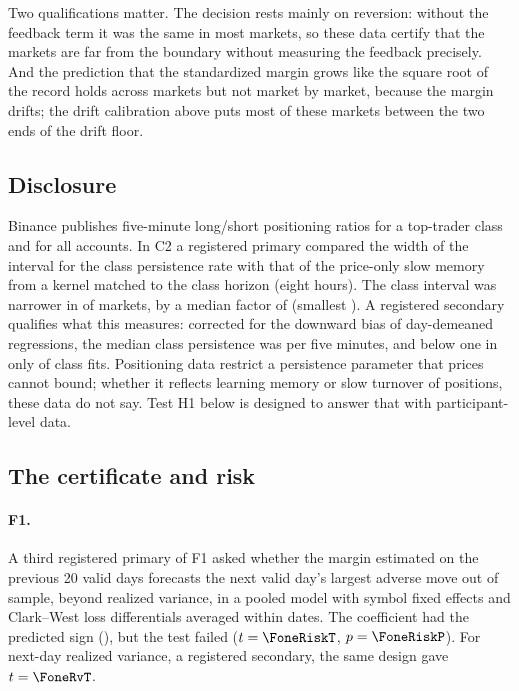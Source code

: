 \documentclass[12pt]{article}
\theoremstyle{definition}
\theoremstyle{remark}
\begin{document}
Two qualifications matter. The decision rests mainly on reversion: without the feedback term it was the same in most markets, so these data certify that the markets are far from the boundary without measuring the feedback precisely. And the prediction that the standardized margin grows like the square root of the record holds across markets but not market by market, because the margin drifts; the drift calibration above puts most of these markets between the two ends of the drift floor.

\subsection{Disclosure}

Binance publishes five-minute long/short positioning ratios for a top-trader class and for all accounts. In C2 a registered primary compared the width of the interval for the class persistence rate with that of the price-only slow memory from a kernel matched to the class horizon (eight hours). The class interval was narrower in \CtwoPthreeTighter{} of \CtwoPthreeSymbols{} markets, by a median factor of \CtwoRatio{} (smallest \CtwoMinRatio{}). A registered secondary qualifies what this measures: corrected for the downward bias of day-demeaned regressions, the median class persistence was \CtwoJackR{} per five minutes, and below one in only \CtwoJackBelow{} of \CtwoClassFits{} class fits. Positioning data restrict a persistence parameter that prices cannot bound; whether it reflects learning memory or slow turnover of positions, these data do not say. Test H1 below is designed to answer that with participant-level data.

\subsection{The certificate and risk}\label{sec:s1}

\paragraph{F1.} A third registered primary of F1 asked whether the margin estimated on the previous 20 valid days forecasts the next valid day's largest adverse move out of sample, beyond realized variance, in a pooled model with symbol fixed effects and Clark--West loss differentials averaged within dates. The coefficient had the predicted sign (\FoneRiskCoef{}), but the test failed ($t=\FoneRiskT$, $p=\FoneRiskP$). For next-day realized variance, a registered secondary, the same design gave $t=\FoneRvT$.
\end{document}
